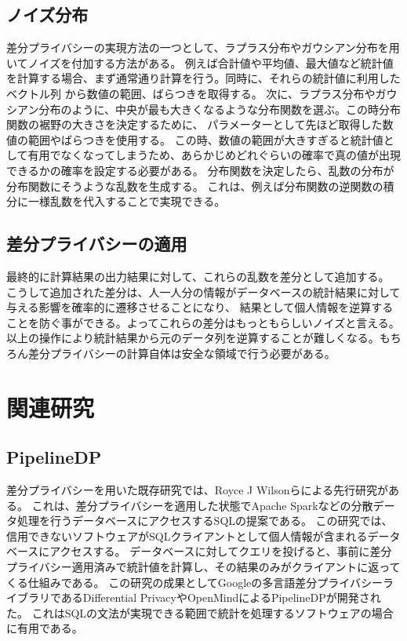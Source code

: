 \documentclass[a4paper,11pt]{jreport}
\begin{document}
\subsection{ノイズ分布}
差分プライバシーの実現方法の一つとして、ラプラス分布やガウシアン分布を用いてノイズを付加する方法がある。
例えば合計値や平均値、最大値など統計値を計算する場合、まず通常通り計算を行う。同時に、それらの統計値に利用したベクトル列
から数値の範囲、ばらつきを取得する。
次に、ラプラス分布やガウシアン分布のように、中央が最も大きくなるような分布関数を選ぶ。この時分布関数の裾野の大きさを決定するために、
パラメーターとして先ほど取得した数値の範囲やばらつきを使用する。
この時、数値の範囲が大きすぎると統計値として有用でなくなってしまうため、あらかじめどれぐらいの確率で真の値が出現できるかの確率を設定する必要がある。
分布関数を決定したら、乱数の分布が分布関数にそうような乱数を生成する。
これは、例えば分布関数の逆関数の積分に一様乱数を代入することで実現できる。\cite{rand}

\subsection{差分プライバシーの適用}
最終的に計算結果の出力結果に対して、これらの乱数を差分として追加する。
こうして追加された差分は、人一人分の情報がデータベースの統計結果に対して与える影響を確率的に遷移させることになり、
結果として個人情報を逆算することを防ぐ事ができる。よってこれらの差分はもっともらしいノイズと言える。
以上の操作により統計結果から元のデータ列を逆算することが難しくなる。もちろん差分プライバシーの計算自体は安全な領域で行う必要がある。


\section{関連研究}

\subsection{PipelineDP}

差分プライバシーを用いた既存研究では、Royce J Wilsonらによる先行研究\cite{dpsql}がある。
これは、差分プライバシーを適用した状態でApache Spark\cite{apache}などの分散データ処理を行うデータベースにアクセスするSQLの提案である。
この研究では、信用できないソフトウェアがSQLクライアントとして個人情報が含まれるデータベースにアクセスする。
データベースに対してクエリを投げると、事前に差分プライバシー適用済みで統計値を計算し、その結果のみがクライアントに返ってくる仕組みである。
この研究の成果としてGoogleの多言語差分プライバシーライブラリであるDifferential Privacy\cite{googledp}やOpenMindによるPipelineDP\cite{openmind}が開発された。
これはSQLの文法が実現できる範囲で統計を処理するソフトウェアの場合に有用である。
\end{document}
